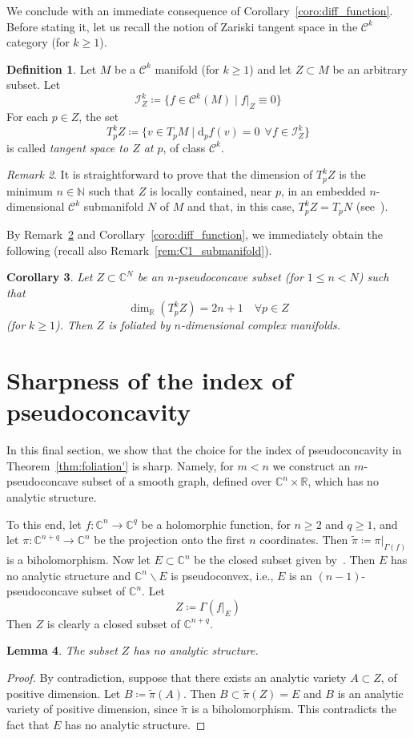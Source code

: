 \documentclass[reqno,oneside]{amsart}
\newcommand{\numberset}{\mathbb}
\newcommand{\N}{\numberset{N}}
\newcommand{\R}{\numberset{R}}
\newcommand{\C}{\numberset{C}}
\renewcommand{\d}{\mathrm{d}}
\theoremstyle{definition}
\newtheorem{definition}{Definition}[section]
\theoremstyle{plain}
\newtheorem{lemma}[definition]{Lemma}
\newtheorem{corollary}[definition]{Corollary}
\theoremstyle{remark}
\newtheorem{remark}[definition]{Remark}
\begin{document}
We conclude with an immediate consequence of Corollary~\ref{coro:diff_function}. Before stating it, let us recall the notion of Zariski tangent space in the $\mathscr{C}^k$ category (for $k\geq 1$).
\begin{definition}
	Let $M$ be a $\mathscr{C}^k$ manifold (for $k\geq 1$) and let $Z\subset M$ be an arbitrary subset. Let
	\[
		\mathcal{I}_Z^k\coloneqq\{f\in\mathscr{C}^k(M) \mid f|_Z\equiv 0\}
	\]
	For each $p\in Z$, the set
	\[
		T_p^kZ\coloneqq\{v\in T_pM \mid \d_pf(v)=0 \ \ \forall f\in\mathcal{I}_Z^k\}
	\]
	is called \emph{tangent space to $Z$ at $p$}, of class $\mathscr{C}^k$.
\end{definition}
\begin{remark}
\label{rem:loc_submanifold}
	It is straightforward to prove that the dimension of $T_p^kZ$ is the minimum $n\in\N$ such that $Z$ is locally contained, near $p$, in an embedded $n$-dimensional $\mathscr{C}^k$ submanifold $N$ of $M$ and that, in this case, $T_p^kZ=T_pN$ (see~\cite[Proposition~2.6(c)]{ara_mon:core}).
\end{remark}
By Remark~\ref{rem:loc_submanifold} and Corollary~\ref{coro:diff_function}, we immediately obtain the following (recall also Remark~\ref{rem:C1_submanifold}).
\begin{corollary}
	Let $Z\subset\C^N$ be an $n$-pseudoconcave subset (for $1\leq n<N$) such that
	\[
		\dim_\R(T_p^kZ)=2n+1 \quad \forall p\in Z
	\]
	(for $k\geq 1$). Then $Z$ is foliated by $n$-dimensional complex manifolds.
\end{corollary}


\section{Sharpness of the index of pseudoconcavity}
\label{sec:sharpness}
In this final section, we show that the choice for the index of pseudoconcavity in Theorem~\ref{thm:foliation'} is sharp. Namely, for $m<n$ we construct an $m$-pseudoconcave subset of a smooth graph, defined over $\C^n\times\R$, which has no analytic structure.

To this end, let $f:\C^n\to\C^q$ be a holomorphic function, for $n\geq 2$ and $q\geq 1$, and let $\pi:\C^{n+q}\to\C^n$ be the projection onto the first $n$ coordinates. Then $\tilde\pi\coloneqq\pi|_{\Gamma(f)}$ is a biholomorphism. Now let $E\subset\C^n$ be the closed subset given by~\cite[Theorem~1.1]{har_shch_tom:wermer}. Then $E$ has no analytic structure and $\C^n\smallsetminus E$ is pseudoconvex, i.e., $E$ is an $(n-1)$-pseudoconcave subset of $\C^n$. Let
\[
	Z\coloneqq\Gamma(f|_E)
\]
Then $Z$ is clearly a closed subset of $\C^{n+q}$.
\begin{lemma}
	The subset $Z$ has no analytic structure.
\end{lemma}
\begin{proof}
	By contradiction, suppose that there exists an analytic variety $A\subset Z$, of positive dimension. Let $B\coloneqq\tilde\pi(A)$. Then $B\subset\tilde\pi(Z)=E$ and $B$ is an analytic variety of positive dimension, since $\tilde\pi$ is a biholomorphism. This contradicts the fact that $E$ has no analytic structure.
\end{proof}
\end{document}
